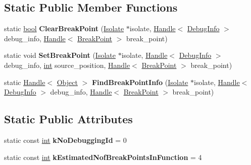\subsection*{Static Public Member Functions}
\begin{DoxyCompactItemize}
\item 
\mbox{\label{classv8_1_1internal_1_1DebugInfo_a5e3bddbd6ec1b2b9774ffc54012a7237}} 
static \mbox{\hyperlink{classbool}{bool}} {\bfseries Clear\+Break\+Point} (\mbox{\hyperlink{classv8_1_1internal_1_1Isolate}{Isolate}} $\ast$isolate, \mbox{\hyperlink{classv8_1_1internal_1_1Handle}{Handle}}$<$ \mbox{\hyperlink{classv8_1_1internal_1_1DebugInfo}{Debug\+Info}} $>$ debug\+\_\+info, \mbox{\hyperlink{classv8_1_1internal_1_1Handle}{Handle}}$<$ \mbox{\hyperlink{classv8_1_1internal_1_1BreakPoint}{Break\+Point}} $>$ break\+\_\+point)
\item 
\mbox{\label{classv8_1_1internal_1_1DebugInfo_a9e3fecebdb4add55d803f04a0c2215cb}} 
static void {\bfseries Set\+Break\+Point} (\mbox{\hyperlink{classv8_1_1internal_1_1Isolate}{Isolate}} $\ast$isolate, \mbox{\hyperlink{classv8_1_1internal_1_1Handle}{Handle}}$<$ \mbox{\hyperlink{classv8_1_1internal_1_1DebugInfo}{Debug\+Info}} $>$ debug\+\_\+info, \mbox{\hyperlink{classint}{int}} source\+\_\+position, \mbox{\hyperlink{classv8_1_1internal_1_1Handle}{Handle}}$<$ \mbox{\hyperlink{classv8_1_1internal_1_1BreakPoint}{Break\+Point}} $>$ break\+\_\+point)
\item 
\mbox{\label{classv8_1_1internal_1_1DebugInfo_ab7ff70697fdfdc8b02e1b9fd9a7bfd79}} 
static \mbox{\hyperlink{classv8_1_1internal_1_1Handle}{Handle}}$<$ \mbox{\hyperlink{classv8_1_1internal_1_1Object}{Object}} $>$ {\bfseries Find\+Break\+Point\+Info} (\mbox{\hyperlink{classv8_1_1internal_1_1Isolate}{Isolate}} $\ast$isolate, \mbox{\hyperlink{classv8_1_1internal_1_1Handle}{Handle}}$<$ \mbox{\hyperlink{classv8_1_1internal_1_1DebugInfo}{Debug\+Info}} $>$ debug\+\_\+info, \mbox{\hyperlink{classv8_1_1internal_1_1Handle}{Handle}}$<$ \mbox{\hyperlink{classv8_1_1internal_1_1BreakPoint}{Break\+Point}} $>$ break\+\_\+point)
\end{DoxyCompactItemize}
\subsection*{Static Public Attributes}
\begin{DoxyCompactItemize}
\item 
\mbox{\label{classv8_1_1internal_1_1DebugInfo_ac7a050cc8b20bfba88c1441716cb158b}} 
static const \mbox{\hyperlink{classint}{int}} {\bfseries k\+No\+Debugging\+Id} = 0
\item 
\mbox{\label{classv8_1_1internal_1_1DebugInfo_a0b1600830cc1002be957fe793f3cf28c}} 
static const \mbox{\hyperlink{classint}{int}} {\bfseries k\+Estimated\+Nof\+Break\+Points\+In\+Function} = 4
\end{DoxyCompactItemize}


